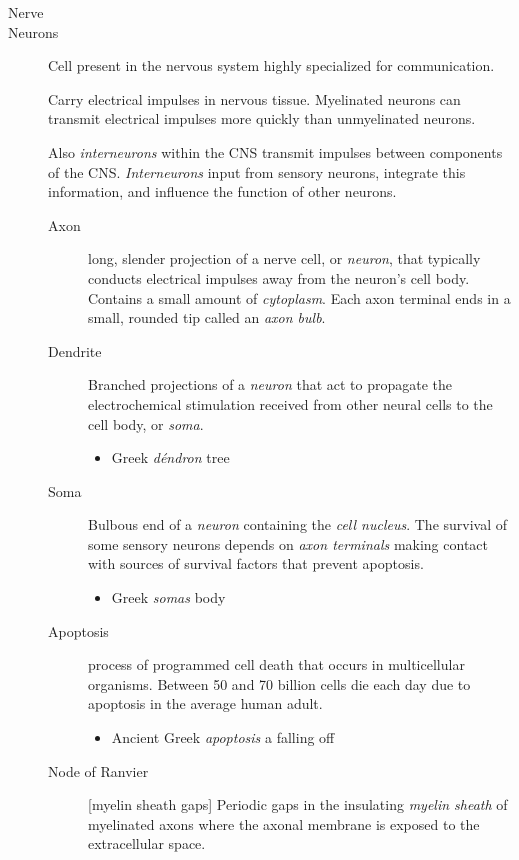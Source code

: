 \documentclass[11pt]{article}
\begin{document}
\begin{description}
\item[{Nerve}] 


\item[{Neurons}] Cell present in the nervous system highly specialized for
communication.

Carry electrical impulses in nervous tissue. Myelinated neurons can
transmit electrical impulses more quickly than unmyelinated neurons.

Also \emph{interneurons} within the CNS transmit impulses between components
of the CNS. \emph{Interneurons} input from sensory neurons, integrate this
information, and influence the function of other neurons.

\begin{description}
\item[{Axon}] long, slender projection of a nerve cell, or \emph{neuron}, that
typically conducts electrical impulses away from the neuron's cell
body. Contains a small amount of \emph{cytoplasm}. Each axon terminal ends
in a small, rounded tip called an \emph{axon bulb}.
\item[{Dendrite}] Branched projections of a \emph{neuron} that act to propagate the
electrochemical stimulation received from other neural cells to the
cell body, or \emph{soma}.
\begin{itemize}
\item Greek \emph{déndron} tree
\end{itemize}
\item[{Soma}] Bulbous end of a \emph{neuron} containing the \emph{cell nucleus}. The
survival of some sensory neurons depends on \emph{axon terminals} making
contact with sources of survival factors that prevent apoptosis.
\begin{itemize}
\item Greek \emph{somas} body
\end{itemize}
\item[{Apoptosis}] process of programmed cell death that occurs in
multicellular organisms. Between 50 and 70 billion cells die each day
due to apoptosis in the average human adult.
\begin{itemize}
\item Ancient Greek \emph{apoptosis} a falling off
\end{itemize}
\item[{Node of Ranvier}] [myelin sheath gaps] Periodic gaps in the insulating
\emph{myelin sheath} of myelinated axons where the axonal membrane is
exposed to the extracellular space.
\end{description}
\end{description}
\end{document}
